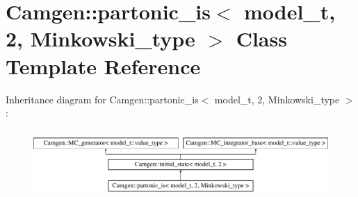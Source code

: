 \hypertarget{a00414}{}\section{Camgen\+:\+:partonic\+\_\+is$<$ model\+\_\+t, 2, Minkowski\+\_\+type $>$ Class Template Reference}
\label{a00414}
Inheritance diagram for Camgen\+:\+:partonic\+\_\+is$<$ model\+\_\+t, 2, Minkowski\+\_\+type $>$\+:\begin{figure}[H]
\begin{center}
\leavevmode
\includegraphics[height=2.608696cm]{a00414}
\end{center}
\end{figure}
